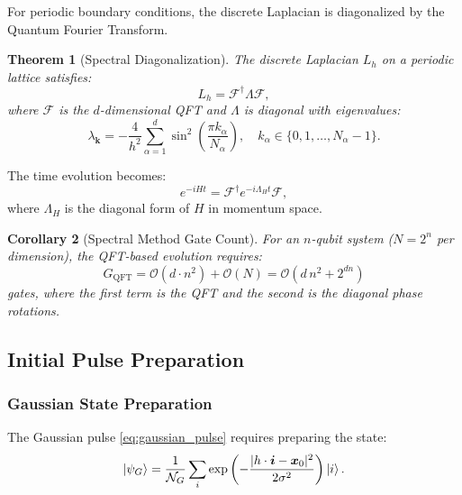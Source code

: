 \documentclass[11pt,a4paper]{article}
\newcommand{\Order}{\mathcal{O}}
\newcommand{\laph}{L_h}
\newcommand{\vecx}{\bm{x}}
\newcommand{\veck}{\bm{k}}
\newcommand{\Fourier}{\mathcal{F}}
\theoremstyle{plain}
\newtheorem{theorem}{Theorem}[section]
\newtheorem{corollary}[theorem]{Corollary}
\theoremstyle{definition}
\theoremstyle{remark}
\begin{document}
For periodic boundary conditions, the discrete Laplacian is diagonalized by the Quantum Fourier Transform.

\begin{theorem}[Spectral Diagonalization]\label{thm:spectral}
The discrete Laplacian $\laph$ on a periodic lattice satisfies:
\begin{equation}
    \laph = \Fourier^\dagger \Lambda \Fourier,
\end{equation}
where $\Fourier$ is the $d$-dimensional QFT and $\Lambda$ is diagonal with eigenvalues:
\begin{equation}\label{eq:eigenvalues}
    \lambda_{\veck} = -\frac{4}{h^2}\sum_{\alpha=1}^{d} \sin^2\left(\frac{\pi k_\alpha}{N_\alpha}\right), \quad k_\alpha \in \{0, 1, \ldots, N_\alpha-1\}.
\end{equation}
\end{theorem}

The time evolution becomes:
\begin{equation}\label{eq:spectral_evolution}
    e^{-iHt} = \Fourier^\dagger e^{-i\Lambda_H t} \Fourier,
\end{equation}
where $\Lambda_H$ is the diagonal form of $H$ in momentum space.

\begin{corollary}[Spectral Method Gate Count]
For an $n$-qubit system ($N = 2^n$ per dimension), the QFT-based evolution requires:
\begin{equation}\label{eq:qft_gates}
    G_{\text{QFT}} = \Order(d \cdot n^2) + \Order(N) = \Order(d\, n^2 + 2^{dn})
\end{equation}
gates, where the first term is the QFT and the second is the diagonal phase rotations.
\end{corollary}

\subsection{Initial Pulse Preparation}\label{subsec:pulse_preparation}

\subsubsection{Gaussian State Preparation}

The Gaussian pulse \eqref{eq:gaussian_pulse} requires preparing the state:
\begin{equation}\label{eq:gaussian_state}
    \ket{\psi_G} = \frac{1}{\mathcal{N}_G} \sum_{i} \exp\left(-\frac{|h\cdot\bm{i} - \vecx_0|^2}{2\sigma^2}\right) \ket{i}.
\end{equation}
\end{document}
